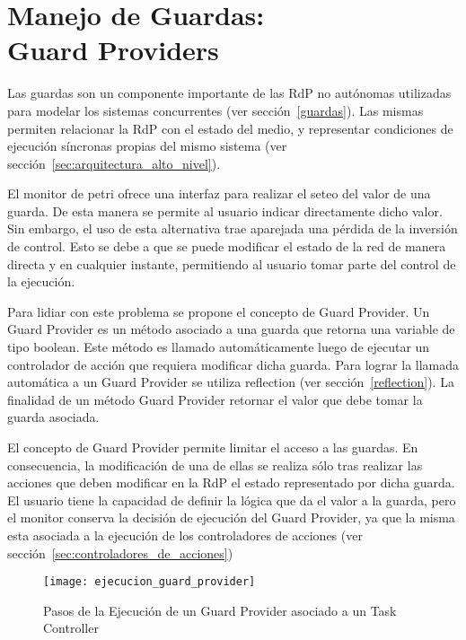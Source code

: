 \section{Manejo de Guardas: \\ Guard Providers}
\label{sec:guard_providers}
Las guardas son un componente importante de las RdP no autónomas utilizadas para
modelar los sistemas concurrentes (ver
sección~\ref{guardas}). Las mismas
permiten relacionar la RdP con el estado del medio, y representar condiciones de
ejecución síncronas propias del mismo sistema (ver
sección~\ref{sec:arquitectura_alto_nivel}).

El monitor de petri ofrece una interfaz para realizar el seteo del valor
de una guarda. De esta manera se permite al usuario indicar directamente
dicho valor. Sin embargo, el uso de esta alternativa trae aparejada una pérdida
de la inversión de control. Esto se debe a que se puede modificar el estado
de la red de manera directa y en cualquier instante, permitiendo al usuario tomar
parte del control de la ejecución.

Para lidiar con este problema se propone el concepto de Guard Provider. Un Guard
Provider es un método asociado a una guarda que retorna una variable de tipo
boolean. Este método es llamado automáticamente luego de ejecutar un controlador
de acción que requiera modificar dicha guarda. Para lograr la llamada automática
a un Guard Provider se utiliza reflection (ver sección~\ref{reflection}). La
finalidad de un método Guard Provider retornar el valor que debe
tomar la guarda asociada. 

El concepto de Guard Provider permite limitar el acceso a las
guardas. En consecuencia, la modificación de una de ellas se realiza sólo tras
realizar las acciones que deben modificar en la RdP el estado representado por
dicha guarda. El usuario tiene la capacidad de definir la lógica que da el
valor a la guarda, pero el monitor conserva la decisión de ejecución del Guard
Provider, ya que la misma esta asociada a la ejecución de los controladores de acciones (ver
sección~\ref{sec:controladores_de_acciones})

\begin{figure}[H]
	\centering
	\texttt{[image: ejecucion\_guard\_provider]}
	\caption{Pasos de la Ejecución de un Guard Provider asociado a un Task
	Controller }
	\label{fig:ejecucion_guard_provider}
\end{figure}